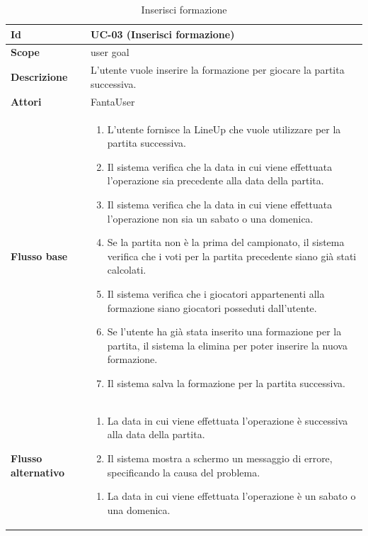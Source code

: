 \begin{table}[H]
\caption{Inserisci formazione}
\label{UC-03}

\begin{tabularx}{\textwidth}{|l|X|}
\hline
\textbf{Id} & UC-03 (Inserisci formazione) \\
\hline
\textbf{Scope} & user goal \\
\hline
\textbf{Descrizione} & L'utente vuole inserire la formazione per giocare la partita successiva. \\
\hline
\textbf{Attori} & FantaUser \\
\hline
\textbf{Flusso base} &
\begin{enumerate}[leftmargin=*]
    \item L'utente fornisce la LineUp che vuole utilizzare per la partita successiva.
    \item Il sistema verifica che la data in cui viene effettuata l'operazione 
            sia precedente alla data della partita.
    \item Il sistema verifica che la data in cui viene effettuata l'operazione 
            non sia un sabato o una domenica.
    \item Se la partita non è la prima del campionato, il sistema verifica che 
            i voti per la partita precedente siano già stati calcolati. 
    \item Il sistema verifica che i giocatori appartenenti alla formazione 
            siano giocatori posseduti dall'utente.
    \item Se l'utente ha già stata inserito una formazione per la partita, 
            il sistema la elimina per poter inserire la nuova formazione.
    \item Il sistema salva la formazione per la partita successiva.
\end{enumerate} \\
\hline
\textbf{Flusso alternativo} &
\begin{enumerate}[leftmargin=*,label=2.\arabic*]
    \item La data in cui viene effettuata l'operazione è successiva alla data della partita.
    \item Il sistema mostra a schermo un messaggio di errore, specificando la causa del problema.
\end{enumerate}
\begin{enumerate}[leftmargin=*,label=3.\arabic*]
    \item La data in cui viene effettuata l'operazione è un sabato o una domenica.

\end{enumerate}
\end{tabularx}
\end{table}
